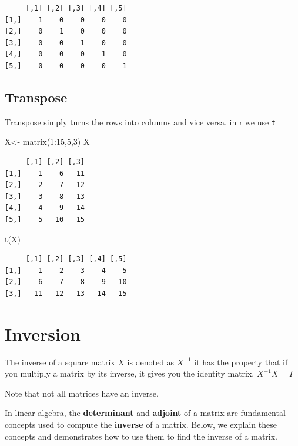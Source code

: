 \documentclass[
  letterpaper,
  DIV=11,
  numbers=noendperiod]{scrartcl}
\newenvironment{Shaded}{\begin{snugshade}}{\end{snugshade}}
\newcommand{\DecValTok}[1]{\textcolor[rgb]{0.68,0.00,0.00}{#1}}
\newcommand{\FunctionTok}[1]{\textcolor[rgb]{0.28,0.35,0.67}{#1}}
\newcommand{\NormalTok}[1]{\textcolor[rgb]{0.00,0.23,0.31}{#1}}
\newcommand{\OtherTok}[1]{\textcolor[rgb]{0.00,0.23,0.31}{#1}}
\newcommand{\SpecialCharTok}[1]{\textcolor[rgb]{0.37,0.37,0.37}{#1}}
\begin{document}
\begin{verbatim}
     [,1] [,2] [,3] [,4] [,5]
[1,]    1    0    0    0    0
[2,]    0    1    0    0    0
[3,]    0    0    1    0    0
[4,]    0    0    0    1    0
[5,]    0    0    0    0    1
\end{verbatim}

\subsection{Transpose}\label{transpose}

Transpose simply turns the rows into columns and vice versa, in r we use
\texttt{t}

\begin{Shaded}
\begin{Highlighting}[]
\NormalTok{X}\OtherTok{\textless{}{-}} \FunctionTok{matrix}\NormalTok{(}\DecValTok{1}\SpecialCharTok{:}\DecValTok{15}\NormalTok{,}\DecValTok{5}\NormalTok{,}\DecValTok{3}\NormalTok{)}
\NormalTok{X}
\end{Highlighting}
\end{Shaded}

\begin{verbatim}
     [,1] [,2] [,3]
[1,]    1    6   11
[2,]    2    7   12
[3,]    3    8   13
[4,]    4    9   14
[5,]    5   10   15
\end{verbatim}

\begin{Shaded}
\begin{Highlighting}[]
\FunctionTok{t}\NormalTok{(X)}
\end{Highlighting}
\end{Shaded}

\begin{verbatim}
     [,1] [,2] [,3] [,4] [,5]
[1,]    1    2    3    4    5
[2,]    6    7    8    9   10
[3,]   11   12   13   14   15
\end{verbatim}

\section{Inversion}\label{inversion}

The inverse of a square matrix \(X\) is denoted as \(X^{-1}\) it has the
property that if you multiply a matrix by its inverse, it gives you the
identity matrix. \(X^{-1}X=I\)

Note that not all matrices have an inverse.

In linear algebra, the \textbf{determinant} and \textbf{adjoint} of a
matrix are fundamental concepts used to compute the \textbf{inverse} of
a matrix. Below, we explain these concepts and demonstrates how to use
them to find the inverse of a matrix.
\end{document}
